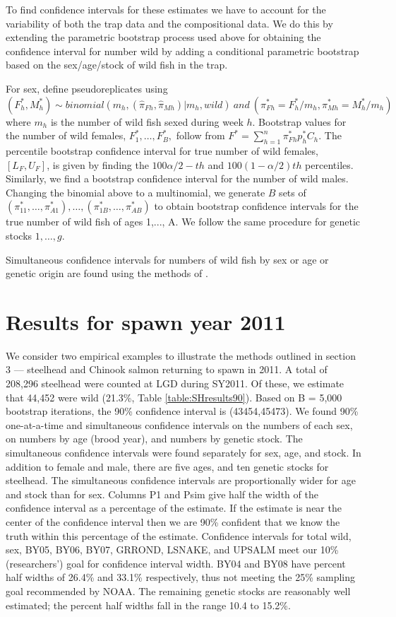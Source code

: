 \documentclass[12pt]{article}
\begin{document}
To find confidence intervals for these estimates we have to account for the variability of both the trap data and the compositional data.  We do this by extending the parametric bootstrap process used above for obtaining the confidence interval for number wild by adding a conditional parametric bootstrap based on the sex/age/stock of wild fish in the trap.

For sex, define pseudoreplicates using
\[(F^*_h,M^*_h) \sim binomial(m_h,(\hat{\pi}_{Fh},\hat{\pi}_{Mh})|m_h, wild) \ and \ (\pi^*_{Fh}=F^*_h/m_h,\pi^*_{Mh}=M^*_h/m_h) \]	  
where \(m_h\)  is the number of wild fish sexed during week $h$.  Bootstrap values for the number of wild females, \(F^*_1,\ldots, F^*_B, \) follow from \(F^*=\sum\limits_{h=1}^{n}\pi^*_{Fh} p^*_{h}C_h \).    The percentile bootstrap confidence interval for true number of wild females, \([L_F,U_F]\), is given by finding the \(100 \alpha/2-th\) and \(100(1-\alpha/2)th\) percentiles.  Similarly, we find a bootstrap confidence interval for the number of wild males.   Changing the binomial above to a multinomial, we generate $B$ sets of \((\pi^*_{11}, \ldots, \pi^*_{A1}), \ldots,(\pi^*_{1B}, \ldots, \pi^*_{AB})\) to obtain bootstrap confidence intervals for the true number of wild fish of ages 1,..., A. We follow the same procedure for genetic stocks $1,\ldots,g$.

Simultaneous confidence intervals for numbers of wild fish by sex or age or genetic origin are found using the methods of . 

\section{Results for spawn year 2011}
\label{sec:results}

We consider two empirical examples to illustrate the methods outlined in section 3 –-- steelhead and Chinook salmon returning to spawn in 2011. A total of 208,296 steelhead were counted at LGD during SY2011. Of these, we estimate that 44,452 were wild (21.3\%, Table \ref{table:SHresults90}).  Based on B = 5,000 bootstrap iterations, the 90\% confidence interval is (43454,45473). We found 90\% one-at-a-time and simultaneous confidence intervals on the numbers of each sex, on numbers by age (brood year), and numbers by genetic stock. The simultaneous confidence intervals were found separately for sex, age, and stock. In addition to female and male, there are five ages, and ten genetic stocks for steelhead. The simultaneous confidence intervals are proportionally wider for age and stock than for sex. Columns P1 and Psim give half the width of the confidence interval as a percentage of the estimate. If the estimate is near the center of the confidence interval then we are 90\% confident that we know the truth within this percentage of the estimate. Confidence intervals for total wild, sex, BY05, BY06, BY07, GRROND, LSNAKE, and UPSALM meet our 10\% (researchers') goal for confidence interval width. BY04 and BY08 have percent half widths of 26.4\% and 33.1\% respectively, thus not meeting the 25\% sampling goal recommended by NOAA. The remaining genetic stocks are reasonably well estimated; the percent half widths fall in the range 10.4 to 15.2\%.
\end{document}
